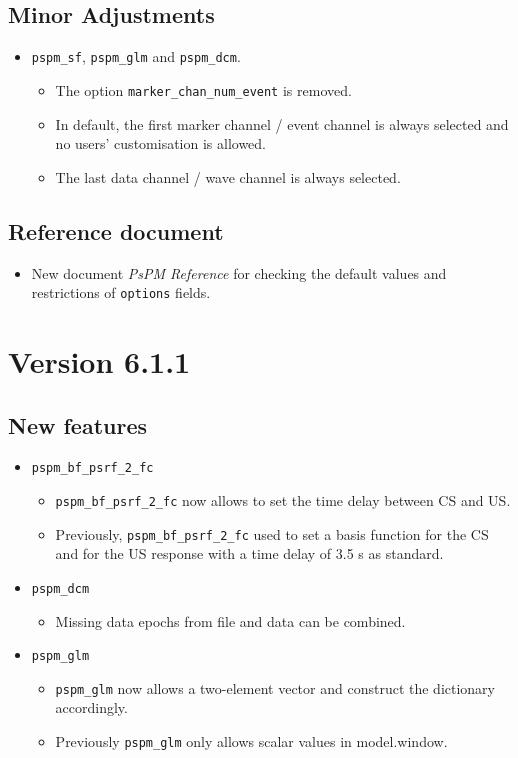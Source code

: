 \documentclass[english]{article}
\numberwithin{equation}{section}
\numberwithin{figure}{section}
\begin{document}
\subsection*{Minor Adjustments}
    \begin{itemize}
    	\item \texttt{pspm\_sf}, \texttt{pspm\_glm} and \texttt{pspm\_dcm}.
    	\begin{itemize}
    		\item The option \texttt{marker\_chan\_num\_event} is removed.
    		\item In default, the first marker channel / event channel is always selected and no users' customisation is allowed.
    		\item The last data channel / wave channel is always selected.
    	\end{itemize}
    \end{itemize}
\subsection*{Reference document}
    \begin{itemize}
    	\item New document \textit{PsPM Reference} for checking the default values and restrictions of \texttt{options} fields.
    \end{itemize}

\section{Version 6.1.1}

\subsection*{New features}
\begin{itemize}
\item \texttt{pspm\_bf\_psrf\_2\_fc}
\begin{itemize}
\item \texttt{pspm\_bf\_psrf\_2\_fc} now allows to set the time delay between
CS and US.
\item Previously, \texttt{pspm\_bf\_psrf\_2\_fc} used to set a basis function
for the CS and for the US response with a time delay of 3.5 s as standard.
\end{itemize}
\item \texttt{pspm\_dcm}
\begin{itemize}
\item Missing data epochs from file and data can be combined.
\end{itemize}
\item \texttt{pspm\_glm}
\begin{itemize}
\item \texttt{pspm\_glm} now allows a two-element vector and construct the
dictionary accordingly.
\item Previously \texttt{pspm\_glm} only allows scalar values in model.window.
\end{itemize}
\end{itemize}
\end{document}
